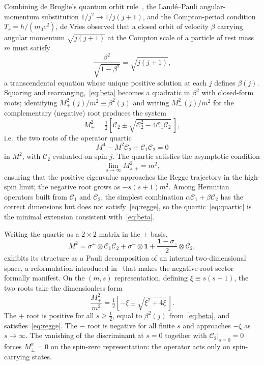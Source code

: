 \documentclass[twocolumn,aps,prd,floatfix,nofootinbib,superscriptaddress,10pt]{article}
\newcommand{\C}{\mathcal{C}}
\begin{document}
Combining de Broglie's quantum orbit rule~\cite{deBroglie1923}, the Land\'e--Pauli angular-momentum substitution $1/j^2\to 1/j(j+1)$, and the Compton-period condition $T_r=h/(m_0c^2)$, de Vries observed that a closed orbit of velocity $\beta$ carrying angular momentum $\sqrt{j(j+1)}$ at the Compton scale of a particle of rest mass $m$ must satisfy
\begin{equation}
\frac{\beta^2}{\sqrt{1-\beta^2}}=\sqrt{j(j+1)},
\label{eq:beta}
\end{equation}
a transcendental equation whose unique positive solution at each $j$ defines $\beta(j)$. Squaring and rearranging,~\eqref{eq:beta} becomes a quadratic in $\beta^2$ with closed-form roots; identifying $M^2_+(j)/m^2\equiv\beta^2(j)$ and writing $M^2_-(j)/m^2$ for the complementary (negative) root produces the system
\begin{equation}
M^2_\pm = \tfrac12\!\left[\C_2\pm\sqrt{\C_2^2-4\C_1\C_2}\,\right],
\label{eq:roots}
\end{equation}
i.e.\ the two roots of the operator quartic
\begin{equation}
M^4 - M^2\C_2 + \C_1\C_2 = 0
\label{eq:quartic}
\end{equation}
in $M^2$, with $\C_2$ evaluated on spin $j$. The quartic satisfies the asymptotic condition
\begin{equation}
\lim_{s\to\infty} M^2_{s,+} = m^2,
\label{eq:regge}
\end{equation}
ensuring that the positive eigenvalue approaches the Regge trajectory in the high-spin limit; the negative root grows as $-s(s+1)m^2$. Among Hermitian operators built from $\C_1$ and $\C_2$, the simplest combination $\alpha\C_1+\beta\C_2$ has the correct dimensions but does not satisfy~\eqref{eq:regge}, so the quartic~\eqref{eq:quartic} is the minimal extension consistent with~\eqref{eq:beta}.

Writing the quartic as a $2\times2$ matrix in the $\pm$ basis,
\begin{equation}
M^2 = \sigma^+\otimes\C_1\C_2 + \sigma^-\otimes \mathbf{1} + \frac{\mathbf{1}-\sigma_z}{2}\otimes\C_2 ,
\label{eq:pauli}
\end{equation}
exhibits its structure as a Pauli decomposition of an internal two-dimensional space, a reformulation introduced in~\cite{Rivero2006} that makes the negative-root sector formally manifest. On the $(m,s)$ representation, defining $\xi\equiv s(s+1)$, the two roots take the dimensionless form
\begin{equation}
\frac{M^2_\pm}{m^2}=\tfrac12\!\left[-\xi\pm\sqrt{\xi^2+4\xi}\,\right].
\label{eq:eigen}
\end{equation}
The $+$ root is positive for all $s\ge\tfrac12$, equal to $\beta^2(j)$ from~\eqref{eq:beta}, and satisfies~\eqref{eq:regge}. The $-$ root is negative for all finite $s$ and approaches $-\xi$ as $s\to\infty$. The vanishing of the discriminant at $s=0$ together with $\C_2|_{s=0}=0$ forces $M^2_\pm=0$ on the spin-zero representation: the operator acts only on spin-carrying states.
\end{document}
